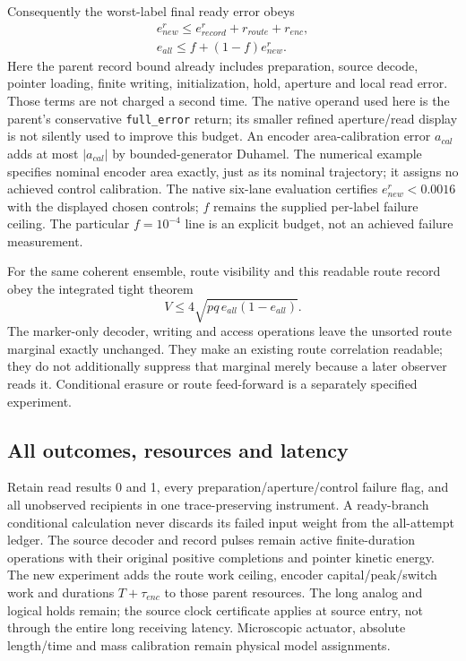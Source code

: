 Consequently the worst-label final ready error obeys
\begin{equation}
\begin{gathered}
e_{new}^{r}\leq e_{record}^{r}+r_{route}+r_{enc},\\
 e_{all}\leq f+(1-f)e_{new}^{r}.
\end{gathered}
\label{eq:new-complete-error}
\end{equation}
Here the parent record bound already includes preparation, source decode,
pointer loading, finite writing, initialization, hold, aperture and local
read error. Those terms are not charged a second time. The native
operand used here is the parent's conservative \texttt{full\_error}
return; its smaller refined aperture/read display is not silently used
to improve this budget. An encoder area-calibration error \(a_{cal}\)
adds at most \(|a_{cal}|\) by bounded-generator Duhamel. The numerical
example specifies nominal encoder area exactly, just as its nominal
trajectory; it assigns no achieved control calibration. The native
six-lane evaluation certifies \(e_{new}^{r}<0.0016\) with the displayed
chosen controls; \(f\) remains the supplied per-label failure ceiling.
The particular \(f=10^{-4}\) line is an explicit budget, not an achieved
failure measurement.

For the same coherent ensemble, route visibility and this readable
route record obey the integrated tight theorem
\[
 V\leq4\sqrt{pq\,e_{all}(1-e_{all})}.
\]
The marker-only decoder, writing and access operations leave the
unsorted route marginal exactly unchanged. They make an existing route
correlation readable; they do not additionally suppress that marginal
merely because a later observer reads it. Conditional erasure or
route feed-forward is a separately specified experiment.

\subsection{All outcomes, resources and latency}
Retain read results 0 and 1, every preparation/aperture/control failure
flag, and all unobserved recipients in one trace-preserving instrument.
A ready-branch conditional calculation never discards its failed input
weight from the all-attempt ledger. The source decoder and record pulses
remain active finite-duration operations with their original positive
completions and pointer kinetic energy. The new experiment adds the
route work ceiling, encoder capital/peak/switch work and durations
\(T+\tau_{enc}\) to those parent resources. The long analog and logical
holds remain; the source clock certificate applies at source entry, not
through the entire long receiving latency. Microscopic actuator, absolute
length/time and mass calibration remain physical model assignments.

